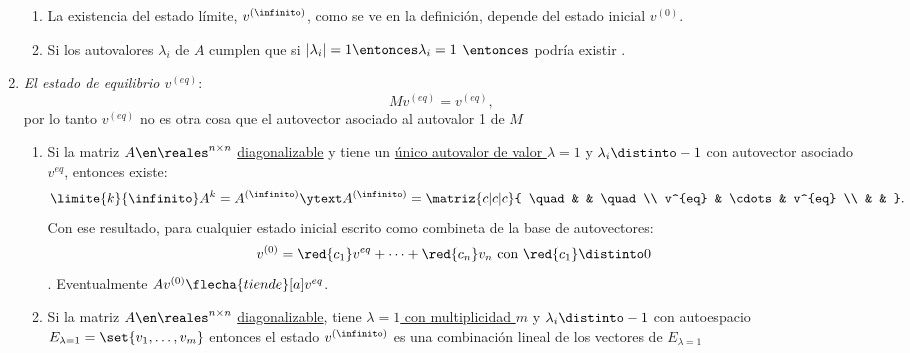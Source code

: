 \begin{enumerate}[label=\tiny\purple{\faIcon{snowman}}]
        \begin{enumerate}[label=\red{\tiny\faIcon{pray}$_{\arabic*}$}]
          \item La existencia del estado límite, $v^{(\infinito)}$, como se ve en la definición, depende del estado inicial $v^{(0)}$.

          \item Si los autovalores $\lambda_i$ de $A$ cumplen que si
                $|\lambda_i| = 1 \entonces \lambda_i = 1 $
                $\entonces$ podría existir .
        \end{enumerate}

  \item \textit{El estado de equilibrio $v^{(eq)}$}:
        $$
          M v^{(eq)} = v^{(eq)},
        $$
        por lo tanto $v^{(eq)}$ no es otra cosa que el autovector asociado al autovalor 1 de $M$

        \begin{enumerate}[label=\blue{\tiny\faIcon{pray}$_{\arabic*}$}]
          \item Si la matriz $A \en \reales^{n \times n}$ \ul{diagonalizable} y tiene un \ul{único autovalor de valor $\lambda = 1$} y
                $\lambda_i \distinto -1$ con autovector asociado $v^{eq}$, entonces existe:
                $$
                  \limite{k}{\infinito} A^k = A^{(\infinito)}
                  \ytext
                  A^{(\infinito)} =
                  \matriz{c|c|c}{
                    \quad &  & \quad \\
                    v^{eq} & \cdots & v^{eq} \\
                    &  &
                  }.
                $$
                Con ese resultado, para cualquier estado inicial escrito como combineta de la base de autovectores:
                $$
                  v^{(0)} = \red{c_1} v^{eq} + \cdots +  \red{c_n}v_n \text { con }  \red{c_1} \distinto 0
                $$.
                Eventualmente $A v^{(0)} \flecha{tiende}[a] v^{eq}$.

          \item Si la matriz $A\en \reales^{n \times n}$ \ul{diagonalizable}, tiene \ul{$\lambda = 1$ con multiplicidad $m$} y $\lambda_i \distinto -1$ con
                autoespacio $E_{\lambda = 1} = \set{v_1, \ldots, v_m}$
                entonces el estado $v^{(\infinito)}$ es una combinación lineal de los vectores de $E_{\lambda = 1}$

        \end{enumerate}
\end{enumerate}
